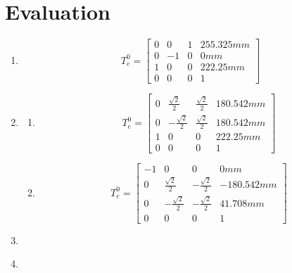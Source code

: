 \documentclass[12pt]{article}
\begin{document}
\section{Evaluation}
\begin{enumerate}
\item
\begin{equation}	
	T^{0}_{e} = \begin{bmatrix}
	0 & 0 & 1 & 255.325mm\\
	0 & -1 & 0 & 0mm\\
	1 & 0 & 0 & 222.25mm\\
	0 & 0 & 0 & 1
	\end{bmatrix}
\end{equation}
\item
\begin{enumerate}
\item
\begin{equation}	
	T^{0}_{e} = \begin{bmatrix}
	0 & \frac{\sqrt{2}}{2} & \frac{\sqrt{2}}{2} & 180.542mm\\
	0 & -\frac{\sqrt{2}}{2} & \frac{\sqrt{2}}{2} & 180.542mm\\
	1 & 0 & 0 & 222.25mm\\
	0 & 0 & 0 & 1
	\end{bmatrix}
\end{equation}
\item
\begin{equation}	
	T^{0}_{e} = \begin{bmatrix}
	-1 & 0 & 0 & 0mm\\
	0 & \frac{\sqrt{2}}{2} & -\frac{\sqrt{2}}{2} & -180.542mm\\
	0 & -\frac{\sqrt{2}}{2} & -\frac{\sqrt{2}}{2} & 41.708mm\\
	0 & 0 & 0 & 1
	\end{bmatrix}
\end{equation}
\end{enumerate}
\item
\item
\begin{figure}
	\centering 

\end{figure}
\end{enumerate}
\end{document}
